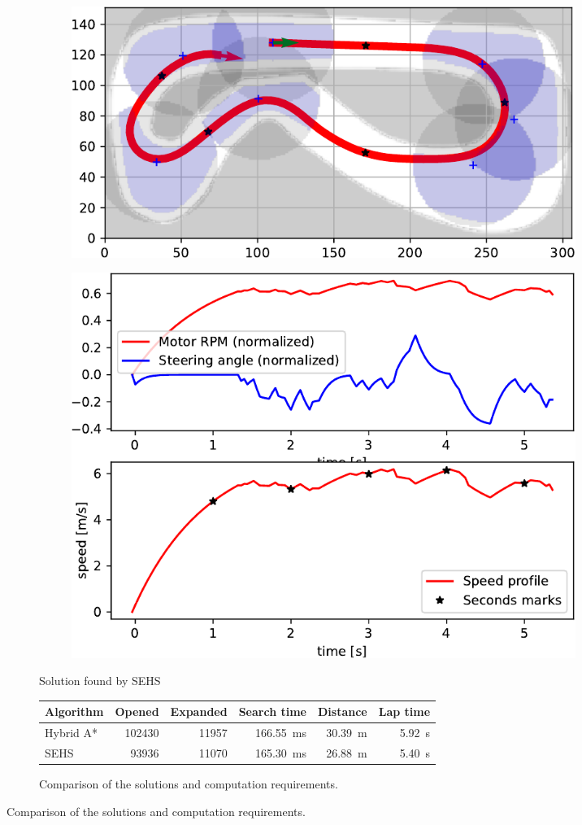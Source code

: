 \begin{figure}[!tbp]
	\begin{subfigure}[t]{\textwidth}
		\begin{subfigure}[t]{0.45\textwidth}
			\includegraphics[width=\textwidth]{../img/experiments/porto-sehs-trajectory}
		\end{subfigure}
		\hfill
		\begin{subfigure}[t]{0.45\textwidth}
			\includegraphics[width=\textwidth]{../img/experiments/porto-sehs-actuators}
		\end{subfigure}
		\caption{Solution found by SEHS}
		\label{fig:solution_porto-sehs}
	\end{subfigure}

	\vspace{0.75cm}
	
	\begin{subfigure}[t]{\textwidth}
		\centering
		\begin{tabular}{l r r r r r}%
			\toprule
			Algorithm & Opened & Expanded & Search time & Distance & Lap time \\
			\midrule
			Hybrid A* & \num{102430} & \num{11957} & \SI{166.55}{\milli\second} & \SI{30.39}{\meter} & \SI{5.92}{\second} \\
			SEHS & \num{93936} & \num{11070} & \SI{165.30}{\milli\second} & \SI{26.88}{\meter} & \SI{5.40}{\second} \\
			\bottomrule
		\end{tabular}
		\caption{Comparison of the solutions and computation requirements.}
		\label{table:porto}
	\end{subfigure}


\end{figure}
